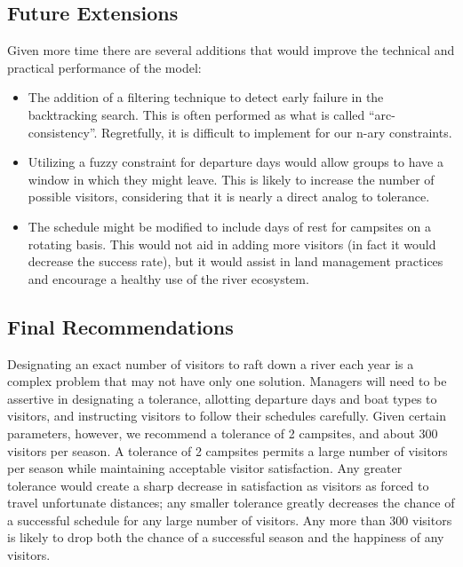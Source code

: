 \documentclass[11pt]{article} %
\begin{document}
\subsection{Future Extensions}
\label{sec:extensions}
Given more time there are several additions that would improve the technical
and practical performance of the model:
\begin{itemize}
\item The addition of a filtering technique to detect early failure in the
backtracking search.  This is often performed as what is called
``arc-consistency''.  Regretfully, it is difficult to implement for our
n-ary constraints.
\item Utilizing a fuzzy constraint for departure days would allow groups
to have a window in which they might leave.  This is likely to increase the
number of possible visitors, considering that it is nearly a direct analog
to tolerance.
\item The schedule might be modified to include days of rest for campsites
on a rotating basis.  This would not aid in adding more visitors (in fact it
would decrease the success rate), but it would assist in land management
practices and encourage a healthy use of the river ecosystem.
\end{itemize}


\subsection{Final Recommendations}
\label{sec:final}
Designating an exact number of visitors to raft down a river each year is
a complex problem that may not have only one solution. Managers will need
to be assertive in designating a tolerance, allotting departure days and
boat types to visitors, and instructing visitors to follow their schedules
carefully. Given certain parameters, however, we recommend a tolerance of
2 campsites, and about 300 visitors per season. A tolerance of 2 campsites
permits a large number of visitors per season while maintaining acceptable
visitor satisfaction. Any greater tolerance would create a sharp decrease
in satisfaction as visitors as forced to travel unfortunate distances; any
smaller tolerance greatly decreases the chance of a successful schedule for
any large number of visitors. Any more than 300 visitors is likely to drop
both the chance of a successful season and the happiness of any visitors.


\newpage




\end{document}
